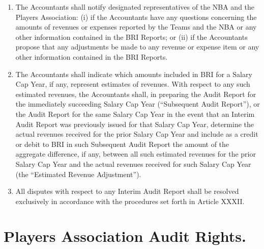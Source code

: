 \documentclass[
]{book}
\begin{document}
\begin{enumerate}
\item
  The Accountants shall notify designated representatives of the NBA and the Players Association: (i) if the Accountants have any questions concerning the amounts of revenues or expenses reported by the Teams and the NBA or any other information contained in the BRI Reports; or (ii) if the Accountants propose that any adjustments be made to any revenue or expense item or any other information contained in the BRI Reports.
\item
  The Accountants shall indicate which amounts included in BRI for a Salary Cap Year, if any, represent estimates of revenues. With respect to any such estimated revenues, the Accountants shall, in preparing the Audit Report for the immediately succeeding Salary Cap Year (``Subsequent Audit Report''), or the Audit Report for the same Salary Cap Year in the event that an Interim Audit Report was previously issued for that Salary Cap Year, determine the actual revenues received for the prior Salary Cap Year and include as a credit or debit to BRI in such Subsequent Audit Report the amount of the aggregate difference, if any, between all such estimated revenues for the prior Salary Cap Year and the actual revenues received for such Salary Cap Year (the ``Estimated Revenue Adjustment'').
\item
  All disputes with respect to any Interim Audit Report shall be resolved exclusively in accordance with the procedures set forth in Article XXXII.
\end{enumerate}

\hypertarget{players-association-audit-rights.}{%
\section{Players Association Audit Rights.}\label{players-association-audit-rights.}}
\end{document}
